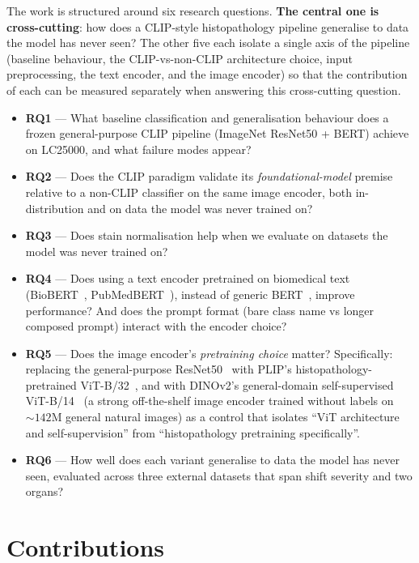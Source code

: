 The work is structured around six research questions. \textbf{The central one is cross-cutting}: how does a CLIP-style histopathology pipeline generalise to data the model has never seen? The other five each isolate a single axis of the pipeline (baseline behaviour, the CLIP-vs-non-CLIP architecture choice, input preprocessing, the text encoder, and the image encoder) so that the contribution of each can be measured separately when answering this cross-cutting question.

\begin{itemize}
    \item \textbf{RQ1} --- What baseline classification and generalisation behaviour does a frozen general-purpose CLIP pipeline (ImageNet ResNet50 + BERT) achieve on LC25000, and what failure modes appear?
    \item \textbf{RQ2} --- Does the CLIP paradigm validate its \emph{foundational-model} premise relative to a non-CLIP classifier on the same image encoder, both in-distribution and on data the model was never trained on?
    \item \textbf{RQ3} --- Does stain normalisation help when we evaluate on datasets the model was never trained on?
    \item \textbf{RQ4} --- Does using a text encoder pretrained on biomedical text (BioBERT~\cite{lee2020biobert}, PubMedBERT~\cite{gu2021pubmedbert}), instead of generic BERT~\cite{devlin2019bert}, improve performance? And does the prompt format (bare class name vs longer composed prompt) interact with the encoder choice?
    \item \textbf{RQ5} --- Does the image encoder's \emph{pretraining choice} matter? Specifically: replacing the general-purpose ResNet50~\cite{he2016resnet} with PLIP's histopathology-pretrained ViT-B/32~\cite{huang2023plip,dosovitskiy2021vit}, and with DINOv2's general-domain self-supervised ViT-B/14~\cite{oquab2024dinov2} (a strong off-the-shelf image encoder trained without labels on $\sim 142$M general natural images) as a control that isolates ``ViT architecture and self-supervision'' from ``histopathology pretraining specifically''.
    \item \textbf{RQ6} --- How well does each variant generalise to data the model has never seen, evaluated across three external datasets that span shift severity and two organs?
\end{itemize}


\section{Contributions}
\label{sec:intro-contributions}

